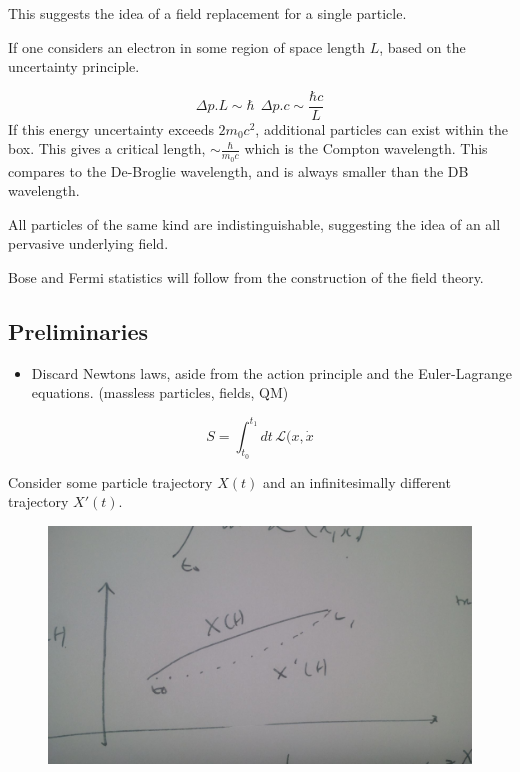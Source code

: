 \documentclass[]{article}
\newcommand{\Lagr}{\mathcal{L}}
\begin{document}
	This suggests the idea of a field replacement for a single particle.
	
	If one considers an electron in some region of space length $L$, based on the uncertainty principle.
	
	\begin{equation}
		\Delta p.L \sim \hbar \:\:
		\Delta p.c \sim \frac{\hbar c}{L}
	\end{equation}
	If this energy uncertainty exceeds $2m_0c^2$, additional particles can exist within the box. This gives a critical length, $\sim \frac{\hbar}{m_0c}$ which is the Compton wavelength. This compares to the De-Broglie wavelength, and is always smaller than the DB wavelength.
	
	All particles of the same kind are indistinguishable, suggesting the idea of an all pervasive underlying field.
	
	Bose and Fermi statistics will follow from the construction of the field theory.
	
	\subsection{Preliminaries}
	\begin{itemize}
		\item Discard Newtons laws, aside from the action principle and the Euler-Lagrange equations. (massless particles, fields, QM)
	\end{itemize}
	
	\begin{equation}
	S = \int_{t_0}^{t_1}dt\, \Lagr(x, \dot{x}
	\end{equation}
	
	Consider some particle trajectory $X(t)$ and an infinitesimally different trajectory $X'(t)$.
	
	\begin{figure}[h]
	\centering
	\includegraphics[angle=90,origin=c,width=0.7\linewidth]{trajectory}
	\label{fig:trajectory}
	\end{figure}
\end{document}
